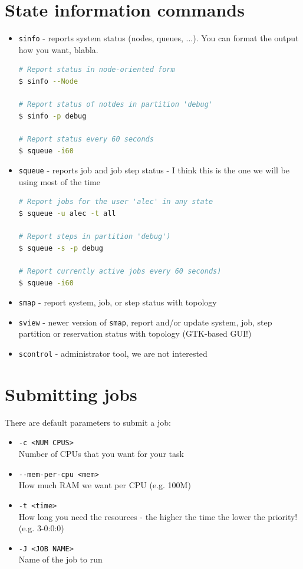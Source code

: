 \documentclass{article}
\begin{document}
\section{State information commands}
\begin{itemize}
	\item \verb|sinfo| - reports system status (nodes, queues, ...).
		You can format the output how you want, blabla.

\begin{lstlisting}[language=bash, frame=single]
# Report status in node-oriented form
$ sinfo --Node 

# Report status of notdes in partition 'debug'
$ sinfo -p debug

# Report status every 60 seconds
$ squeue -i60
\end{lstlisting}

	\item \verb|squeue| - reports job and job step status - I think this is the
		one we will be using most of the time

\begin{lstlisting}[language=bash, frame=single]
# Report jobs for the user 'alec' in any state
$ squeue -u alec -t all

# Report steps in partition 'debug')
$ squeue -s -p debug

# Report currently active jobs every 60 seconds)
$ squeue -i60
\end{lstlisting}

	\item \verb|smap| - report system, job, or step status with topology
	\item \verb|sview| - newer version of \verb|smap|, report and/or update
		system, job, step partition or reservation status with topology
		(GTK-based GUI!)
	\item \verb|scontrol| - administrator tool, we are not interested
\end{itemize}


\section{Submitting jobs}
There are default parameters to submit a job:

\begin{itemize}
\item \verb|-c <NUM CPUS>|\\Number of CPUs that you want for your task
\item \verb|--mem-per-cpu <mem>|\\How much RAM we want per CPU (e.g. 100M)
\item \verb|-t <time>|\\How long you need the resources - the higher the time
	the lower the priority! (e.g. 3-0:0:0)
\item \verb|-J <JOB NAME>|\\Name of the job to run
\end{itemize}
\end{document}
